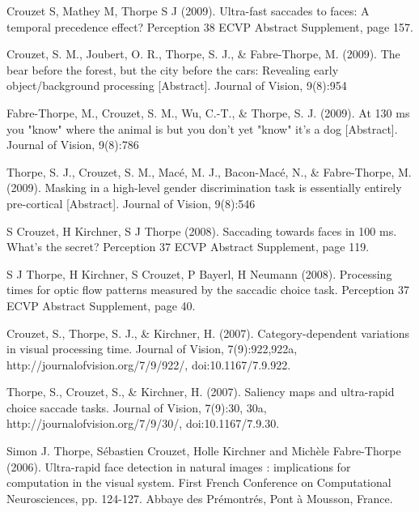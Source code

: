 \documentclass[margin,line]{resume}
\begin{document}
\begin{resume}
\vspace{-2mm} Crouzet S, Mathey M, Thorpe S J (2009). Ultra-fast saccades to faces: A temporal precedence effect? Perception 38 ECVP Abstract Supplement, page 157.

\vspace{-2mm} Crouzet, S. M., Joubert, O. R., Thorpe, S. J., \& Fabre-Thorpe, M. (2009). The bear before the forest, but the city before the cars: Revealing early object/background processing [Abstract]. Journal of Vision, 9(8):954

\vspace{-2mm} Fabre-Thorpe, M., Crouzet, S. M., Wu, C.-T., \& Thorpe, S. J. (2009). At 130 ms you "know" where the animal is but you don't yet "know" it's a dog [Abstract]. Journal of Vision, 9(8):786

\vspace{-2mm} Thorpe, S. J., Crouzet, S. M., Macé, M. J., Bacon-Macé, N., \& Fabre-Thorpe, M. (2009). Masking in a high-level gender discrimination task is essentially entirely pre-cortical [Abstract]. Journal of Vision, 9(8):546

\vspace{-2mm} S Crouzet, H Kirchner, S J Thorpe (2008). Saccading towards faces in 100 ms. What's the secret? Perception 37 ECVP Abstract Supplement, page 119. 

\vspace{-2mm} S J Thorpe, H Kirchner, S Crouzet, P Bayerl, H Neumann (2008). Processing times for optic flow patterns measured by the saccadic choice task. Perception 37 ECVP Abstract Supplement, page 40.

\vspace{-2mm} Crouzet, S., Thorpe, S. J., \& Kirchner, H. (2007). Category-dependent variations in visual processing time. Journal of Vision, 7(9):922,922a, http://journalofvision.org/7/9/922/, doi:10.1167/7.9.922.

\vspace{-2mm} Thorpe, S., Crouzet, S., \& Kirchner, H. (2007). Saliency maps and ultra-rapid choice saccade tasks. Journal of Vision, 7(9):30, 30a, http://journalofvision.org/7/9/30/, doi:10.1167/7.9.30.

\vspace{-2mm} Simon J. Thorpe, Sébastien Crouzet, Holle Kirchner and Michèle Fabre-Thorpe (2006). Ultra-rapid face detection in natural images : implications for computation in the visual system. First French Conference on Computational Neurosciences, pp. 124-127. Abbaye des Prémontrés, Pont à Mousson, France.


\end{resume}
\end{document}
